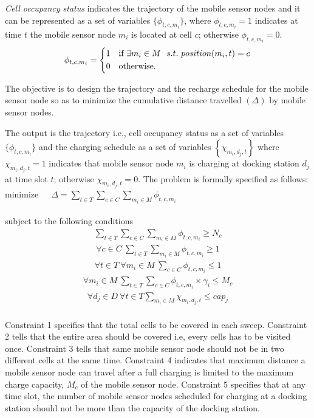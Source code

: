 \textit{Cell occupancy status} indicates the trajectory of the mobile sensor nodes and it can be represented as a set of variables $ \{ \phi_{t,c,m_i} \}$, where $ \phi_{t,c,m_i} = 1 $ indicates at time $t$ the mobile sensor node $m_i$ is located at cell $c$; otherwise $ \phi_{t,c,m_i} = 0 $.
\[
\phi_{t,c,m_i}=
\begin{dcases}
1 & \text{if}\  \exists {m_i \in {M}}\ \ s.t. \ position(m_i, t) = c  \\
0 & \text{otherwise.}
\end{dcases}
\]


The objective is to design the trajectory and the recharge schedule for the mobile sensor node so as to  minimize the cumulative distance travelled $(\Delta)$ by mobile sensor nodes.

The output is the trajectory i.e., cell occupancy status as a set of variables $ \{ \phi_{t,c,m_i} \}$   and the charging schedule as a set of variables $\left\lbrace \chi_{m_i,d_j,t} \right\rbrace $ where $\chi_{m_i,d_j,t} = 1 $ indicates that mobile sensor node $m_i$ is charging at docking station $d_j$ at time slot $t$; otherwise $\chi_{m_i,d_j,t} = 0 $. The problem is formally specified as follows:\\

minimize\ \ \ 
$
\Delta = \sum\limits_{t \in T} \sum\limits_{c \in C} \sum\limits_{m_i \in M} \phi_{t,c,m_i}
$\\\\
subject to the following conditions
\begin{eqnarray}
\sum\limits_{t \in T} \sum\limits_{c \in C} \sum\limits_{m_i \in M} \phi_{t,c,m_i} \geq N_c 
\end{eqnarray}
\begin{eqnarray}
\forall{c\in C}\ \sum\limits_{t \in T} \sum\limits_{m_i \in M} \phi_{t,c,m_i} \geq 1
\end{eqnarray}
\begin{eqnarray}
\forall{t\in T}\ \forall{m_i \in M}\  \sum\limits_{c \in C} \phi_{t,c,m_i} \leq 1
\end{eqnarray}
\begin{eqnarray}
\forall{m_i \in M}\ \sum\limits_{t \in T} \sum\limits_{c \in C} \phi_{t,c,m_i} \times \gamma_i \leq M_c
\end{eqnarray}
\begin{eqnarray}
\forall{d_j \in D}\ \forall{t \in T} \sum\limits_{m_i \in M}{ \chi_{m_i,d_j,t} } \leq cap_j 
\end{eqnarray}\\
Constraint 1 specifies that the total cells to be covered in each sweep. Constraint 2 tells that the entire area should be covered i.e, every cells has to be visited once. Constraint 3 tells that same mobile sensor node should not be in two different cells at the same time. Constraint 4 indicates that maximum distance a mobile sensor node can travel after a full charging is limited to the maximum charge capacity, $M_c$ of the mobile sensor node. Constraint 5 specifies that at any time slot, the number of mobile sensor nodes scheduled for charging at a docking station should not be more than the capacity of the docking station. 

